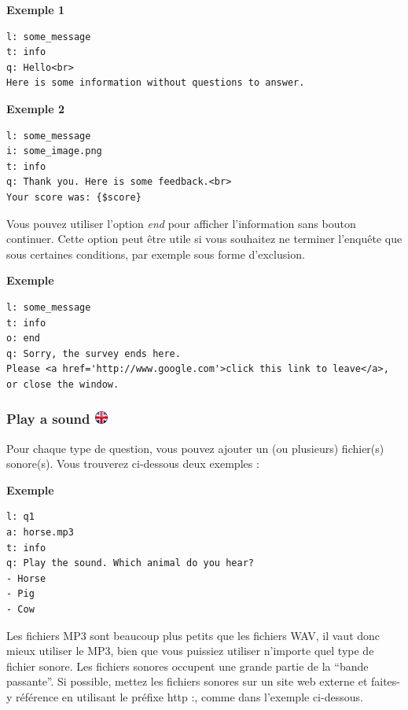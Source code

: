 \documentclass[
]{book}
\begin{document}
\textbf{Exemple 1}

\begin{verbatim}
l: some_message
t: info
q: Hello<br>
Here is some information without questions to answer.
\end{verbatim}

\textbf{Exemple 2}

\begin{verbatim}
l: some_message
i: some_image.png
t: info
q: Thank you. Here is some feedback.<br>
Your score was: {$score}
\end{verbatim}

Vous pouvez utiliser l'option \emph{end} pour afficher l'information sans bouton continuer. Cette option peut être utile si vous souhaitez ne terminer l'enquête que sous certaines conditions, par exemple sous forme d'exclusion.

\textbf{Exemple}

\begin{verbatim}
l: some_message
t: info
o: end
q: Sorry, the survey ends here.
Please <a href='http://www.google.com'>click this link to leave</a>, or close the window.
\end{verbatim}

\hypertarget{play-a-sound}{%
\subsubsection[Play a sound ]{\texorpdfstring{Play a sound \href{https://www.psytoolkit.org/doc3.1.0/online-survey-syntax.html\#sound}{\protect\includegraphics{img/ukflag.png}}}{Play a sound }}\label{play-a-sound}}

Pour chaque type de question, vous pouvez ajouter un (ou plusieurs) fichier(s) sonore(s). Vous trouverez ci-dessous deux exemples :

\textbf{Exemple}

\begin{verbatim}
l: q1
a: horse.mp3
t: info
q: Play the sound. Which animal do you hear?
- Horse
- Pig
- Cow
\end{verbatim}

Les fichiers MP3 sont beaucoup plus petits que les fichiers WAV, il vaut donc mieux utiliser le MP3, bien que vous puissiez utiliser n'importe quel type de fichier sonore. Les fichiers sonores occupent une grande partie de la ``bande passante''. Si possible, mettez les fichiers sonores sur un site web externe et faites-y référence en utilisant le préfixe http :, comme dans l'exemple ci-dessous.
\end{document}
